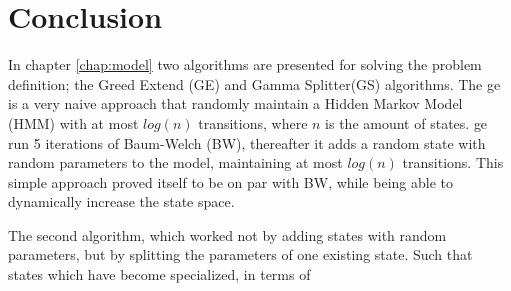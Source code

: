\chapter{Conclusion}
\label{chap:conclusion}
In chapter \ref{chap:model} two algorithms are presented for solving the problem definition; the Greed Extend (GE) and Gamma Splitter(GS) algorithms. The \gls{ge} is a very naive approach that randomly maintain a Hidden Markov Model (HMM) with at most $log(n)$ transitions, where $n$ is the amount of states. \gls{ge} run 5 iterations of Baum-Welch (BW), thereafter it adds a random state with random parameters to the model, maintaining at most $log(n)$ transitions. This simple approach proved itself to be on par with BW, while being able to dynamically increase the state space.

The second algorithm, which worked not by adding states with random parameters, but by splitting the parameters of one existing state. Such that states which have become specialized, in terms of 